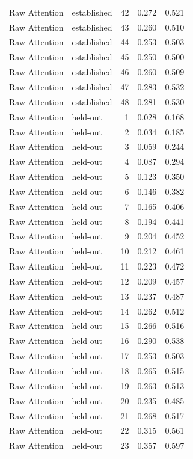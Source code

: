 \begin{tabular}{llrrr}
Raw Attention & established & 42 & 0.272 & 0.521 \\
Raw Attention & established & 43 & 0.260 & 0.510 \\
Raw Attention & established & 44 & 0.253 & 0.503 \\
Raw Attention & established & 45 & 0.250 & 0.500 \\
Raw Attention & established & 46 & 0.260 & 0.509 \\
Raw Attention & established & 47 & 0.283 & 0.532 \\
Raw Attention & established & 48 & 0.281 & 0.530 \\
Raw Attention & held-out & 1 & 0.028 & 0.168 \\
Raw Attention & held-out & 2 & 0.034 & 0.185 \\
Raw Attention & held-out & 3 & 0.059 & 0.244 \\
Raw Attention & held-out & 4 & 0.087 & 0.294 \\
Raw Attention & held-out & 5 & 0.123 & 0.350 \\
Raw Attention & held-out & 6 & 0.146 & 0.382 \\
Raw Attention & held-out & 7 & 0.165 & 0.406 \\
Raw Attention & held-out & 8 & 0.194 & 0.441 \\
Raw Attention & held-out & 9 & 0.204 & 0.452 \\
Raw Attention & held-out & 10 & 0.212 & 0.461 \\
Raw Attention & held-out & 11 & 0.223 & 0.472 \\
Raw Attention & held-out & 12 & 0.209 & 0.457 \\
Raw Attention & held-out & 13 & 0.237 & 0.487 \\
Raw Attention & held-out & 14 & 0.262 & 0.512 \\
Raw Attention & held-out & 15 & 0.266 & 0.516 \\
Raw Attention & held-out & 16 & 0.290 & 0.538 \\
Raw Attention & held-out & 17 & 0.253 & 0.503 \\
Raw Attention & held-out & 18 & 0.265 & 0.515 \\
Raw Attention & held-out & 19 & 0.263 & 0.513 \\
Raw Attention & held-out & 20 & 0.235 & 0.485 \\
Raw Attention & held-out & 21 & 0.268 & 0.517 \\
Raw Attention & held-out & 22 & 0.315 & 0.561 \\
Raw Attention & held-out & 23 & 0.357 & 0.597 \\

\end{tabular}
